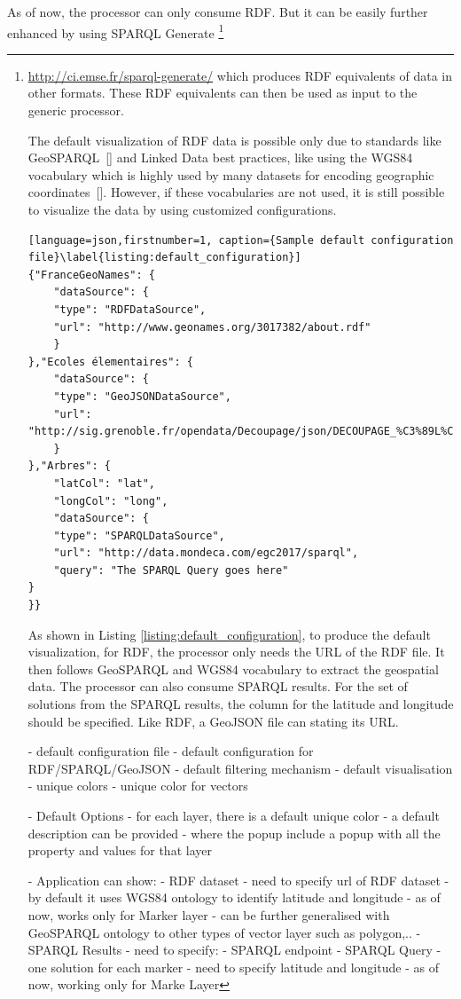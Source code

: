 \documentclass[a4paper,pagenum,english]{rnti}
\begin{document}
As of now, the processor can only consume RDF. But it can be easily further enhanced by using SPARQL Generate \footnote{\url{http://ci.emse.fr/sparql-generate/} which produces RDF equivalents of data in other formats. These RDF equivalents can then be used as input to the generic processor.

The default visualization of RDF data is possible only due to standards like GeoSPARQL~[\cite{perry2012ogc}] and Linked Data best practices, like using the WGS84 vocabulary which is highly used by many datasets for encoding geographic coordinates~[\cite{schmachtenberg2014adoption}]. However, if these vocabularies are not used, it is still possible to visualize the data by using customized configurations.
  
  

\begin{lstlisting}[language=json,firstnumber=1, caption={Sample default configuration file}\label{listing:default_configuration}]
{"FranceGeoNames": {
	"dataSource": {
	"type": "RDFDataSource",
	"url": "http://www.geonames.org/3017382/about.rdf"
	}
},"Ecoles élementaires": {
	"dataSource": {
	"type": "GeoJSONDataSource",
	"url": "http://sig.grenoble.fr/opendata/Decoupage/json/DECOUPAGE_%C3%89L%C3%89MENTAIRES_EPSG4326.json"
	}
},"Arbres": {
	"latCol": "lat",
	"longCol": "long",
	"dataSource": {
	"type": "SPARQLDataSource",
	"url": "http://data.mondeca.com/egc2017/sparql",
	"query": "The SPARQL Query goes here"
}
}}
\end{lstlisting}
 
As shown in Listing \ref{listing:default_configuration}, to produce the default visualization, for RDF, the processor only needs the URL of the RDF file. It then follows GeoSPARQL and WGS84 vocabulary to extract the geospatial data. The processor can also consume SPARQL results. For the set of solutions from the SPARQL results, the column for the latitude and longitude should be specified. Like RDF, a GeoJSON file can stating its URL.


- default configuration file
- default configuration for RDF/SPARQL/GeoJSON
- default filtering mechanism
- default visualisation
	- unique colors
	- unique color for vectors


- Default Options
	- for each layer, there is a default unique color
	- a default description can be provided
		- where the popup include a popup with all the property and values for that layer
		



- Application can show:
	- RDF dataset
		- need to specify url of RDF dataset
		- by default it uses WGS84 ontology to identify latitude and longitude
		- as of now, works only for Marker layer
		- can be further generalised with GeoSPARQL ontology to other types of vector layer such as polygon,.. 
	- SPARQL Results
		- need to specify:
			- SPARQL endpoint
			- SPARQL Query
			- one solution for each marker
			- need to specify latitude and longitude
			- as of now, working only for Marke Layer

}
\end{document}
